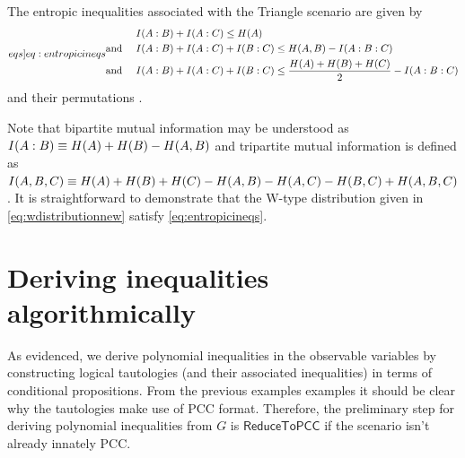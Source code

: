 
The entropic inequalities associated with the Triangle scenario are given by 
\begin{align}\label[eqs]{eq:entropicineqs}\begin{split}
&I\parens{A:B}+I\parens{A:C}\leq H\parens{A}
\\\text{and }\quad&I\parens{A:B}+I\parens{A:C}+I\parens{B:C}\leq H\parens{A,B}-I\parens{A:B:C}
\\\text{and }\quad & I\parens{A:B}+I\parens{A:C}+I\parens{B:C}\leq\frac{H\parens{A}+H\parens{B}+H\parens{C}}{2}-I\parens{A:B:C}
\end{split}\end{align}
and their permutations \cite{chaves2014novel,Chaves2015infoquantum,pusey2014gdag,steudel2010ancestors}.

Note that bipartite mutual information may be understood as $I\lparen A:B\rparen\equiv H\lparen A\rparen+H\lparen B\rparen-H\lparen A,B\rparen$ and tripartite mutual information is defined as $I\lparen A,B,C\rparen\equiv H\lparen A\rparen+H\lparen B\rparen+H\lparen C\rparen-H\lparen A,B\rparen-H\lparen A,C\rparen-H\lparen B,C\rparen+H\lparen A,B,C\rparen$. It is straightforward to demonstrate that the W-type distribution given in \cref{eq:wdistributionnew} satisfy \cref{eq:entropicineqs}.





\section{Deriving inequalities algorithmically}

As evidenced, we derive polynomial inequalities in the observable variables by constructing logical tautologies (and their associated inequalities) in terms of conditional propositions. From the previous examples examples it should be clear why the tautologies make use of PCC format. Therefore, the preliminary step for deriving polynomial inequalities from $G$ is $\mathsf{ReduceToPCC}$ if the scenario isn't already innately PCC.

